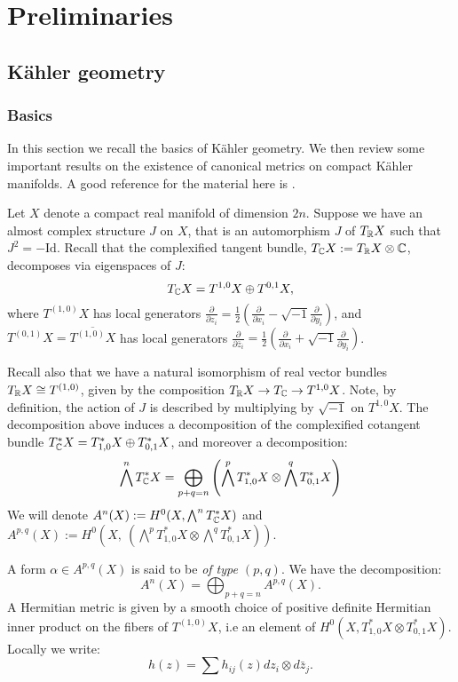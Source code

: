 \chapter{Preliminaries}

\section{K\"ahler geometry}
\subsection{Basics}
In this section we recall the basics of K\"ahler geometry. We then review some important results on the existence of canonical metrics on compact K\"ahler manifolds. A good reference for the material here is \cite{griffiths}.

Let \(X\) denote a compact real manifold of dimension \(2n\). Suppose we have an almost complex structure \(J\) on \(X\), that is an automorphism \(J\) of \(T_{\mathbb{R}} X\) such that \(J^2 = - \text{Id}\). Recall that the complexified tangent bundle, \(T_{\mathbb{C}} X := T_{\mathbb{R}} X \otimes \mathbb{C}\), decomposes via eigenspaces of \(J\):
\[
T_{\mathbb{C}} X = T^{1,0} X \oplus T^{0,1} X,
\]
where \(T^{(1,0)} X\) has local generators \(\frac{\partial}{\partial z_i} = \frac{1}{2} \left( \frac{\partial}{\partial x_i}  - \sqrt{-1} \frac{\partial}{\partial y_i}  \right) \), and \(T^{(0,1)} X = \overline{T^{(1,0)} X}\) has local generators \(\frac{\partial}{\partial \bar{z}_i} = \frac{1}{2} \left( \frac{\partial}{\partial x_i}  + \sqrt{-1} \frac{\partial}{\partial y_i}  \right)\).

Recall also that we have a natural isomorphism of real vector bundles \(T_{\mathbb{R}} X \cong T^{(1,0)}\), given by the composition \(T_{\mathbb{R}} X \to T_{\mathbb{C}} \to T^{1,0}X\). Note, by definition, the action of \(J\) is described by multiplying by \(\sqrt{-1}\) on \(T^{1,0} X\). The decomposition above induces a decomposition of the complexified cotangent bundle \(T^*_{\mathbb{C}} X = T^*_{1,0} X \oplus T^*_{0,1} X\), and moreover a decomposition:
\[
\bigwedge^n T^*_{\mathbb{C}} X = \bigoplus_{p+q = n} \left(\bigwedge^p T^*_{1,0} X \otimes \bigwedge^q T^*_{0,1} X   \right)
\]
We will denote \(A^n(X):= H^0(X,\bigwedge^n T^*_{\mathbb{C}} X)\) and \(A^{p,q}(X) := H^0 \left( X, \ \left(\bigwedge^p T^*_{1,0} X \otimes \bigwedge^q T^*_{0,1} X   \right) \right) \).

A form \(\alpha \in A^{p,q}(X)\) is said to be \textit{of type \((p,q)\)}. We have the decomposition:
\[
A^n(X) = \bigoplus_{p+q = n} A^{p,q}(X).
\]
A Hermitian metric is given by a smooth choice of positive definite Hermitian inner product on the fibers of \(T^{(1,0)}X\), i.e an element of \(H^0(X, T^*_{1,0} X \otimes T^*_{0,1} X) \). Locally we write:
\[
h(z) = \sum h_{ij}(z) dz_i \otimes d\bar{z}_j.
\]

